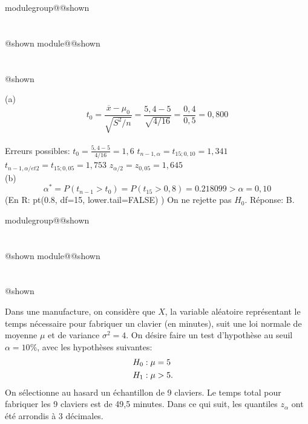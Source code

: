 \documentclass{Evaluation}
\makeatletter
\newcommand{\currentmodulekey}{}
\newcommand{\currentmoduletitle}{}
\newcommand{\currentgroupkey}{}
\newcommand{\currentgrouptitle}{}
\newcommand{\showmoduleifneeded}{%
  \ifx\currentgroupkey\empty\else
    \expandafter\ifx\csname modulegroup@\currentgroupkey @shown\endcsname\relax
      \section*{\currentgrouptitle}%
      \expandafter\gdef\csname modulegroup@\currentgroupkey @shown\endcsname{1}%
    \fi
  \fi
  \expandafter\ifx\csname module@\currentmodulekey @shown\endcsname\relax
    \section*{\currentmoduletitle}%
    \expandafter\gdef\csname module@\currentmodulekey @shown\endcsname{1}%
  \fi
}
\newenvironment{A22}{\showmoduleifneeded}{}
\makeatother
\begin{document}
\begin{questions}
\begin{A22}
\begin{parts}
\end{parts}

	\begin{solution}
  (a) $$ t_0 = \frac{\overline{x}-\mu_0}{\sqrt{S^2/n}} = \frac{ 5,4- 5}{\sqrt{4/16}} = \frac{0,4}{0,5} = 0,800 $$ \\
  Erreurs possibles:
  $ t_0 = \frac{ 5,4- 5}{{4/16}} = 1,6 $
  $ t_{n-1, \alpha} = t_{15; 0,10} = 1,341 $
  $ t_{n-1, \alpha/et 2} = t_{15; 0,05} = 1,753 $
  $ z_{\alpha/2} = z_{0,05} = 1,645$
  \\
 (b) $$ \alpha^* =  P( t_{n-1} > t_0 ) = P( t_{15} > 0,8 ) =  0.218099  > \alpha = 0,10$$
		(En R: pt(0.8, df=15, lower.tail=FALSE) )
		On ne rejette pas $H_0$. Réponse: 	B.
	\end{solution}

\end{A22}

\begin{A22}
\question {} %

Dans une manufacture, on considère que $X$, la variable aléatoire représentant le temps nécessaire pour fabriquer un clavier (en minutes), suit une loi normale de moyenne $\mu$ et de variance $\sigma^2=4$. On désire faire un test d'hypothèse au seuil $\alpha=10\%$, avec les hypothèses suivantes:
\begin{align*}
	H_0&: \mu=5\cr
	H_1&: \mu > 5.
\end{align*}
On sélectionne au hasard un échantillon de 9 claviers. Le temps total pour fabriquer les 9 claviers est de 49,5 minutes. Dans ce qui suit, les quantiles $z_\alpha$ ont été arrondis à 3 décimales.



\end{A22}
\end{questions}
\end{document}

